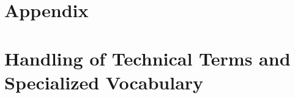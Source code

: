 \documentclass[10pt,twocolumn,letterpaper]{article}
\begin{document}
\clearpage

{\small

}

\clearpage

\appendix
\section*{Appendix}
\renewcommand{\thesection}{\Alph{section}}
\setcounter{section}{0}

\section{Handling of Technical Terms and Specialized Vocabulary}
\end{document}
